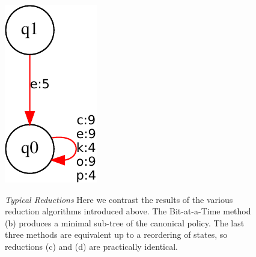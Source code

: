 \begin{figure}
{\includegraphics[scale=0.3, angle=35]{exact.pdf}
}
\caption{\emph{Typical Reductions}
Here we contrast the results of the various reduction algorithms introduced above.
The Bit-at-a-Time method (b) produces a minimal sub-tree of
the canonical policy.
The last three methods are equivalent up to a reordering of states,
so reductions (c) and (d) are practically identical. 
}
\end{figure}

